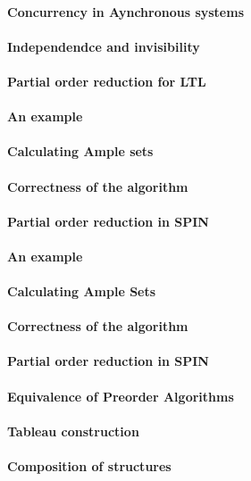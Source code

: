 \paragraph{Concurrency in Aynchronous systems}
\paragraph{Independendce and invisibility}
\paragraph{Partial order reduction for LTL}
\paragraph{An example}
\paragraph{Calculating Ample sets}
\paragraph{Correctness of the algorithm}
\paragraph{Partial order reduction in SPIN}
\paragraph{An example}
\paragraph{Calculating Ample Sets}
\paragraph{Correctness of the algorithm}
\paragraph{Partial order reduction in SPIN}
\paragraph{Equivalence of Preorder Algorithms}
\paragraph{Tableau construction}
\paragraph{Composition of structures}
